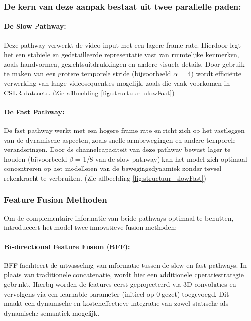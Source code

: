 \subsubsection{De kern van deze aanpak bestaat uit twee parallelle paden:}
\paragraph{De Slow Pathway:}
Deze pathway verwerkt de video-input met een lagere frame rate. 
Hierdoor legt het een stabiele en gedetailleerde representatie vast van ruimtelijke kenmerken, zoals handvormen, gezichtsuitdrukkingen en andere visuele details. 
Door gebruik te maken van een grotere temporele stride (bijvoorbeeld $\alpha$ = 4) wordt efficiënte verwerking van lange videosequenties mogelijk, zoals die vaak voorkomen in CSLR-datasets.
(Zie aflbeelding \ref{fig:structuur_slowFast})

\paragraph{De Fast Pathway:}
De fast pathway werkt met een hogere frame rate en richt zich op het vastleggen van de dynamische aspecten, zoals snelle armbewegingen en andere temporele veranderingen. 
Door de channelcapaciteit van deze pathway bewust lager te houden (bijvoorbeeld $\beta$ = 1/8 van de slow pathway) kan het model zich optimaal concentreren op het modelleren van de bewegingsdynamiek zonder teveel rekenkracht te verbruiken.
(Zie aflbeelding \ref{fig:structuur_slowFast})

\subsubsection{Feature Fusion Methoden}
Om de complementaire informatie van beide pathways optimaal te benutten, introduceert het model twee innovatieve fusion methoden:
\paragraph{Bi-directional Feature Fusion (BFF):}
BFF faciliteert de uitwisseling van informatie tussen de slow en fast pathways. 
In plaats van traditionele concatenatie, wordt hier een additionele operatiestrategie gebruikt. 
Hierbij worden de features eerst geprojecteerd via 3D-convoluties en vervolgens via een learnable parameter (initieel op 0 gezet) toegevoegd. 
Dit maakt een dynamische en kosteneffectieve integratie van zowel statische als dynamische semantiek mogelijk\autocite{10445841}.
